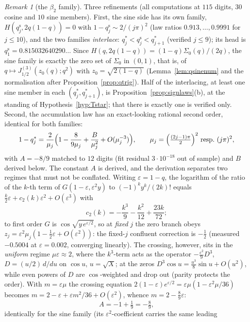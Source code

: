 \documentclass[11pt]{article}
\theoremstyle{plain}
\theoremstyle{definition}
\theoremstyle{remark}
\newtheorem{remark}[theorem]{Remark}
\begin{document}
\begin{remark}[the $\beta_2$ family]
Three refinements (all computations at $115$ digits, $30$ cosine and $10$ sine members). First,
the sine side has its own family, $H(q^{\mathrm s}_j,2q(1-q))=0$ with
$1-q^{\mathrm s}_j\sim2/(j\pi)^2$ (law ratios $0.913,\dots,0.9991$ for $j\le10$), and the two
families \emph{interlace}: $q^\ast_j<q^{\mathrm s}_j<q^\ast_{j+1}$ (verified $j\le9$); its
head is $q^{\mathrm s}_1=0.815032640290\ldots$ Since $H(q,2q(1-q))=(1-q)\Sigma_0(q)/(2q)$, the sine
family is exactly the zero set of $\Sigma_0$ in $(0,1)$, that is, of
$q\mapsto J^{(3)}_{1/2}(z_0(q);q^2)$ with $z_0=\sqrt{2(1-q)}$ (Lemma~\ref{lem:qsinenum} and the
normalisation after Proposition~\ref{prop:qtrig}). Half of the interlacing, at least one sine member
in each $(q^\ast_j,q^\ast_{j+1})$, is Proposition~\ref{prop:signlaws}\textup{(b)}, at the standing
of Hypothesis~\ref{hyp:Tstar}; that there is exactly one is verified only. Second, the accumulation law has an exact-looking
rational second order, identical for both families:
\[
   1-q^\ast_j=\frac{2}{\mu_j}\Bigl(1-\frac{8}{9\mu_j}+\frac{B}{\mu_j^2}
   +O(\mu_j^{-3})\Bigr),\qquad
   \mu_j=\Bigl(\tfrac{(2j-1)\pi}{2}\Bigr)^2\ \text{resp.}\ (j\pi)^2,
\]
with $A=-8/9$ matched to $12$ digits (fit residual $3\cdot10^{-18}$ out of sample) and
$B$ derived below. The constant $A$ is derived, and the derivation separates two regimes that
must not be conflated. Writing $\varepsilon=1-q$, the logarithm of the ratio of the $k$-th term
of $G(1-\varepsilon,\varepsilon^2y)$ to $(-1)^ky^k/(2k)!$ equals
$\tfrac k2\varepsilon+c_2(k)\varepsilon^2+O(\varepsilon^3)$ with
\[
   c_2(k)=-\frac{k^3}{9}-\frac{k^2}{12}+\frac{23k}{72};
\]
to first order $G$ is $\cos\!\sqrt{y\,e^{\varepsilon/2}}$, so at \emph{fixed} $j$ the zero
branch obeys $z_j=\varepsilon^2\mu_j(1-\tfrac12\varepsilon+O(\varepsilon^2))$: the fixed-$j$
confluent correction is $-\tfrac12$ (measured $-0.5004$ at $\varepsilon=0.002$, converging
linearly). The crossing, however, sits in the \emph{uniform} regime $\mu\varepsilon\approx2$,
where the $k^3$-term acts as the operator $-\tfrac{\varepsilon^2}9D^3$, $D=(u/2)\,d/du$ on
$\cos u$, $u=\sqrt{X}$; at the zeros $D^3\cos u=\tfrac{u^3}8\sin u+O(u^2)$, while even powers
of $D$ are $\cos$-weighted and drop out (parity protects the order). With $m=\varepsilon\mu$
the crossing equation $2(1-\varepsilon)e^{\varepsilon/2}=\varepsilon\mu(1-\varepsilon^2\mu/36)$
becomes $m=2-\varepsilon+\varepsilon m^2/36+O(\varepsilon^2)$, whence $m=2-\tfrac89\varepsilon$:
\[
   A=-1+\tfrac19=-\tfrac89 ,
\]
identically for the sine family (its $\varepsilon^2$-coefficient carries the same leading

\end{remark}
\end{document}
